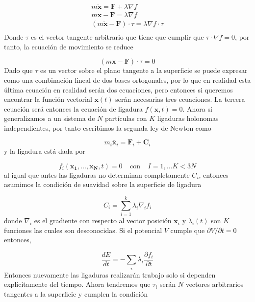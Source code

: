     \begin{gather*}
        m\ddot{\mathbf{x}} = \mathbf{F} + \lambda \nabla f\\
        m\ddot{\mathbf{x}} - \mathbf{F} =  \lambda \nabla f\\
        (m\ddot{\mathbf{x}} - \mathbf{F}) \cdot {\tau} =  \lambda \nabla f \cdot \tau \\
    \end{gather*}
    Donde $\tau$ es el vector tangente arbitrario que tiene que cumplir que $\tau \cdot \nabla f = 0$, por tanto, la ecuación de movimiento se reduce  

    \begin{equation*}
        (m\ddot{\mathbf{x}} - \mathbf{F}) \cdot {\tau} = 0
    \end{equation*}
    Dado que $\tau$ es un vector sobre el plano tangente a la superficie se puede expresar como una combinación lineal de dos bases ortogonales, por lo que en realidad esta última ecuación en realidad serán dos ecuaciones, pero entonces si queremos encontrar la función vectorial $\mathbf{x}(t)$ serán necesarias tres ecuaciones. La tercera ecuación será entonces la ecuación de ligadura $f(\mathbf{x},t) = 0$.    Ahora si generalizamos a un sistema de $N$ partículas con $K$ ligaduras holonomas independientes, por tanto escribimos la segunda ley de Newton como

    \begin{equation*}
        m_i \ddot{\mathbf{x}_i} = \mathbf{F}_i + \mathbf{C}_i
    \end{equation*}
    y la ligadura está dada por

    \begin{equation*}
        f_i (\mathbf{x_1}, \dots, \mathbf{x_N},t) = 0 \;\;\;\; \text{con} \;\;\;\; I = 1, \dots K < 3N
    \end{equation*}
    al igual que antes las ligaduras no determinan completamente $C_i$, entonces asumimos la condición de suavidad sobre la superficie de ligadura 

    \begin{equation*}
        C_i = \sum_{i = 1}^{k} \lambda_i \nabla_i f_i
    \end{equation*}
    donde $\nabla_i$ es el gradiente con respecto al vector posición $\mathbf{x}_i$ y $\lambda_i(t)$ son $K$ funciones las cuales son desconocidas. Si el potencial $V$ cumple que $\partial V/\partial t = 0$ entonces,

    \begin{equation*}
        \frac{dE}{dt} = - \sum_i \lambda_i \frac{\partial f_i}{\partial t}
    \end{equation*}
    Entonces nuevamente las ligaduras realizarán trabajo solo si dependen explícitamente del tiempo. Ahora tendremos que $\tau_i$  serán $N$ vectores arbitrarios tangentes a la superficie y cumplen la condición

